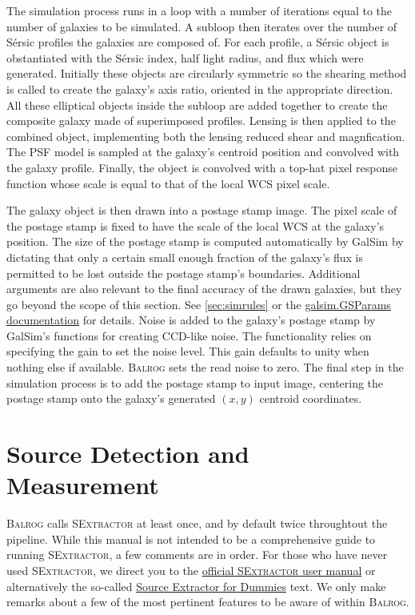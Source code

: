\documentclass[12pt]{book}
\newcommand{\galsim}{GalSim}
\newcommand{\balrog}{\textsc{Balrog}}
\newcommand{\sex}{\textsc{SExtractor}}
\newcommand{\sersic}{S\'{e}rsic}
\begin{document}
The simulation process runs in a loop with a number of iterations equal to the number of galaxies to be simulated.
A subloop then iterates over the number of \sersic{} profiles the galaxies are composed of.
For each profile, a \sersic{} object is obstantiated with the \sersic{} index,
half light radius, and flux which were generated. Initially these objects are circularly symmetric
so the shearing method is called to create the galaxy's axis ratio, oriented in the appropriate direction.
All these elliptical objects inside the subloop are added together to create the composite galaxy made
of superimposed profiles. Lensing is then applied to the combined object, implementing both the
lensing reduced shear and magnfication.
The PSF model is sampled at the galaxy's centroid position and convolved with the galaxy profile.
Finally, the object is convolved with a top-hat pixel response function
whose scale is equal to that of the local WCS pixel scale.

The galaxy object is then drawn into a postage stamp image. The pixel
scale of the postage stamp is fixed to have the scale of the local WCS at the galaxy's position.
The size of the postage stamp is computed automatically by \galsim{} by dictating that
only a certain small enough fraction of the galaxy's flux is permitted to be lost outside the postage stamp's boundaries.
Additional arguments are also relevant to the final accuracy of the drawn galaxies, but
they go beyond the scope of this section. See \autoref{sec:simrules} or the
\href{http://galsim-developers.github.io/GalSim/structgalsim\_1\_1\_g\_s\_params.html}{galsim.GSParams documentation}
for details. Noise is added to the galaxy's postage stamp by \galsim{}'s functions  for creating CCD-like noise.
The functionality relies on specifying the gain to set the noise level. 
This gain defaults to unity when nothing else if available.
\balrog{} sets the read noise to zero.
The final step in the simulation process is to add the postage stamp to input image, centering the
postage stamp onto the galaxy's generated $(x, y)$ centroid coordinates.


\section{Source Detection and Measurement}
\label{sec:processing}

\balrog{} calls \sex{} at least once, and by default twice throughtout the pipeline.
While this manual is not intended to be a comprehensive guide to
running \sex{}, a few comments are in order.
For those who have never used \sex{}, we direct you to the
\href{https://www.astromatic.net/pubsvn/software/sextractor/trunk/doc/sextractor.pdf}{official \sex{} user manual} 
or alternatively the so-called
\href{http://astroa.physics.metu.edu.tr/MANUALS/sextractor/Guide2source\_extractor.pdf}{Source Extractor for Dummies}
text. We only make remarks about a few of the most pertinent features to be aware of within \balrog{}.
\end{document}
